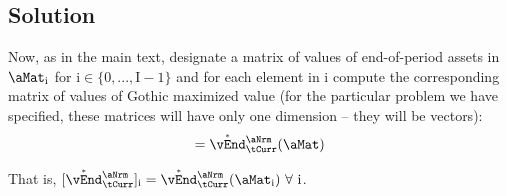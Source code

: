 \documentclass[./SolvingMicroDSOPs_TRP]{subfiles}
\begin{document}
\subsection{Solution}

\newcommand{\aIdx}{\mathrm{i}}
\newcommand{\aCnt}{\mathrm{I}}
\newcommand{\bIdx}{\mathrm{j}}
\newcommand{\bCnt}{\mathrm{J}}
Now, as in the main text, designate a matrix of values of end-of-period assets in $\aMat_{\aIdx}$ for $\aIdx \in \{0,...,\aCnt-1\}$ and for each element in $\aIdx$ compute the corresponding matrix of values of Gothic maximized value (for the particular problem we have specified, these matrices will have only one dimension -- they will be vectors):
\begin{align}
  [\Maxed{\vEnd}^{\aNrm}_{\tCurr}]=\Maxed{\vEnd}^{\aNrm}_{\tCurr}(\aMat) 
\end{align}

That is, $[\Maxed{\vEnd}^{\aNrm}_{\tCurr}]_{\aIdx} = \Maxed{\vEnd}^{\aNrm}_{\tCurr}(\aMat_{\aIdx})~\forall~\aIdx$.
\end{document}
